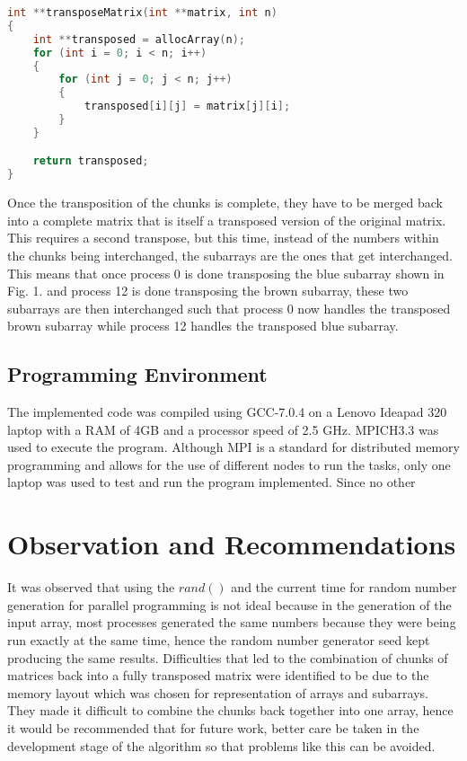 \documentclass[journal]{IEEEtran}
\begin{document}
\begin{lstlisting}[language = C, caption = transpose computation function]
int **transposeMatrix(int **matrix, int n)
{
    int **transposed = allocArray(n);
    for (int i = 0; i < n; i++)
    {
        for (int j = 0; j < n; j++)
        {
            transposed[i][j] = matrix[j][i];
        }
    }

    return transposed;
}
\end{lstlisting}

\noindent
Once the transposition of the chunks is complete, they have to be merged back into a complete matrix that is itself a transposed version of the original matrix. This requires a second transpose, but this time, instead of the numbers within the chunks being interchanged, the subarrays are the ones that get interchanged. This means that once process 0 is done transposing the blue subarray shown in Fig. 1. and process 12 is done transposing the brown subarray, these two subarrays are then interchanged such that process 0 now handles the transposed brown subarray while process 12 handles the transposed blue subarray.

\subsection{Programming Environment}

\noindent
The implemented code was compiled using GCC-7.0.4 on a Lenovo Ideapad 320 laptop with a RAM of 4GB and a processor speed of 2.5 GHz. MPICH3.3 was used to execute the program. Although MPI is a standard for distributed memory programming and allows for the use of different nodes to run the tasks, only one laptop was used to test and run the program implemented. Since no other

\section{Observation and Recommendations}

\noindent
It was observed that using the $rand()$ and the current time for random number generation for parallel programming is not ideal because in the generation of the input array, most processes generated the same numbers because they were being run exactly at the same time, hence the random number generator seed kept producing the same results. Difficulties that led to the combination of chunks of matrices back into a fully transposed matrix were identified to be due to the memory layout which was chosen for representation of arrays and subarrays. They made it difficult to combine the chunks back together into one array, hence it would be recommended that for future work, better care be taken in the development stage of the algorithm so that problems like this can be avoided.
\end{document}

